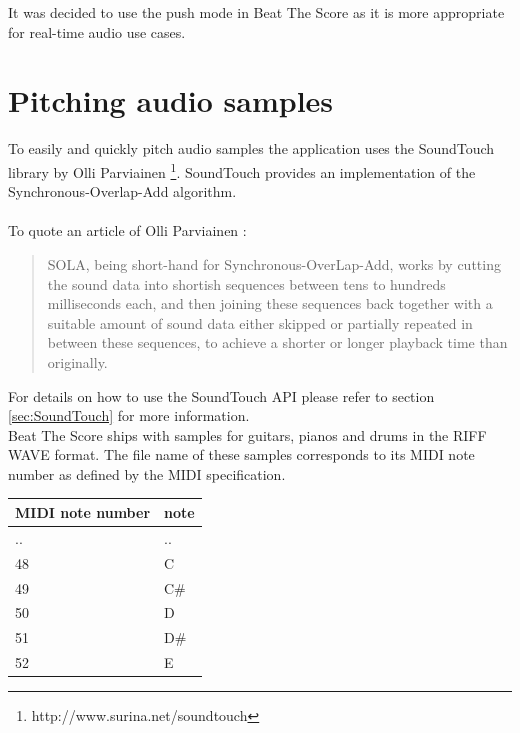 It was decided to use the push mode in Beat The Score as it is more appropriate for real-time audio use cases.

\section{Pitching audio samples}

To easily and quickly pitch audio samples the application uses the SoundTouch library by 
Olli Parviainen \footnote{\label{foot:5}http://www.surina.net/soundtouch}. SoundTouch provides an implementation 
of the Synchronous-Overlap-Add algorithm. 
\\ \\
To quote an article of Olli Parviainen \cite{soundtouch1}: 
\linebreak
\begin{quote}
SOLA, being short-hand for Synchronous-OverLap-Add, works by cutting the sound data into 
shortish sequences between tens to hundreds milliseconds each, and then joining these 
sequences back together with a suitable amount of sound data either skipped or partially 
repeated in between these sequences, to achieve a shorter or longer playback time than originally.
\end{quote}

For details on how to use the SoundTouch API please refer to section \ref{sec:SoundTouch} for more information.
\\
Beat The Score ships with samples for guitars, pianos and drums in the RIFF WAVE format. 
The file name of these samples corresponds to its MIDI note number as defined 
by the MIDI specification. 

\begin{center}
\begin{tabular}{ | l | l | }
  \hline
  MIDI note number & note \\ \hline
  .. & .. \\ \hline
  48 & C \\ \hline
  49 & C\# \\ \hline
  50 & D \\ \hline
  51 & D\# \\ \hline
  52 & E \\ \hline
  \hline
\end{tabular}
\end{center}

